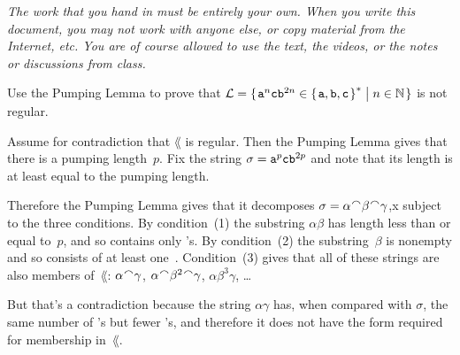 \documentclass[noanswers, nolegalese, 11pt]{examjh}
\begin{document}
\thispagestyle{empty}
\vspace*{1ex}
\begin{center}
 \parbox{0.95\textwidth}{\textit{
  The work that you hand in must be entirely your own. 
  When you write this document, you may not work with anyone else,
  or copy material from the Internet, etc.
  You are of course allowed to use the text, the videos, or the notes
  or discussions from class.
  }}
\end{center}
\vspace*{1ex}

\begin{questions}
\question
Use the Pumping Lemma to prove that 
$  \lang=\set{\str{a}^n\str{c}\str{b}^{2n}\in\kleenestar{\set{\str{a},\str{b},\str{c}}}
            \suchthat n\in\N}
$
is not regular.
\begin{solution}
Assume for contradiction that $\lang$ is regular.
Then the Pumping Lemma gives that there is a pumping length~$p$.  
Fix the string $\sigma=\texttt{a}^p\texttt{c}\texttt{b}^{2p}$ and note that its
length is at least equal to the pumping length.

Therefore the Pumping Lemma gives that  
it decomposes $\sigma=\alpha\concat\beta\concat\gamma$,x subject to the
three conditions.
By condition~(1) the substring $\alpha\beta$ has length less than or equal
to~$p$, and so contains only 's.
By condition~(2) the substring~$\beta$ is nonempty and so consists of
at least one~.
Condition~(3) gives that all of these strings are also members of~$\lang$:
$\alpha\concat\gamma$, $\alpha\concat\beta^2\concat\gamma$, $\alpha\beta^3\gamma$, \ldots{}

But that's a contradiction because the string $\alpha\gamma$ has, when compared
with $\sigma$, the same number of 's but fewer 's, and therefore
it does not have the form required for membership in~$\lang$.
\end{solution}

\end{questions}
\end{document}
